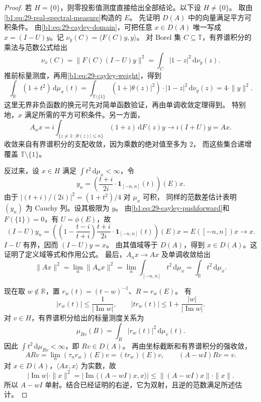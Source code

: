\begin{proof}
若 \(H=\{0\}\)，则零投影值测度直接给出全部结论。以下设 \(H\ne\{0\}\)。
取由\eqref{b1:eq:29-real-spectral-measure}构造的 \(E\)。
先证明 \(D(A)\) 中的向量满足平方可积条件。
由\eqref{b1:eq:29-cayley-domain}，可把任意 \(x\in D(A)\) 唯一写成
\(x=(I-U)y\)。记 \(\nu_y(C)=\langle F(C)y,y\rangle\)。
对 Borel 集 \(C\subseteq\mathbb T\)，有界谱积分的乘法与范数公式给出
\[
 \nu_x(C)=\|F(C)(I-U)y\|^2
 =\int_C|1-z|^2\,\mathrm d\nu_y(z).
\]
推前标量测度，再用\eqref{b1:eq:29-cayley-weight}，得到
\begin{equation}\label{b1:eq:29-cayley-domain-norm}
 \int_{\mathbb R}(1+t^2)\,\mathrm d\mu_x(t)
 =\int_{\mathbb T\setminus\{1\}}
   (1+|\theta(z)|^2)\cdot|1-z|^2\,\mathrm d\nu_y(z)
 =4\cdot\|y\|^2.
\end{equation}
这里无界非负函数的换元可先对简单函数验证，再由单调收敛定理得到。
特别地，\(x\) 满足所需的平方可积条件。另一方面，
\[
 A_nx
 =i\int_{\{z\ne1:\,|\theta(z)|\le n\}}
       (1+z)\,\mathrm dF(z)y
 \longrightarrow i(I+U)y=Ax.
\]
收敛来自有界谱积分的支配收敛，因为乘数的绝对值至多为 \(2\)，
而这些集合递增覆盖 \(\mathbb T\setminus\{1\}\)。

反过来，设 \(x\in H\) 满足 \(\int t^2\,\mathrm d\mu_x<\infty\)，令
\[
 y_n=\left(\frac{t+i}{2i}\cdot\mathbf1_{[-n,n]}(t)\right)(E)x.
\]
由于 \(|(t+i)/(2i)|^2=(1+t^2)/4\) 对 \(\mu_x\) 可积，
同样的范数差估计表明 \((y_n)\) 为 Cauchy 列。设其极限为 \(y\)。
由\eqref{b1:eq:29-cayley-pushforward}和 \(F(\{1\})=0\)，有 \(U=\phi(E)\)，故
\[
 (I-U)y_n
 =\left(\left(1-\frac{t-i}{t+i}\right)
          \frac{t+i}{2i}\cdot\mathbf1_{[-n,n]}(t)\right)(E)x
 =E([-n,n])x\longrightarrow x.
\]
\(I-U\) 有界，因而 \((I-U)y=x\)。
由其值域等于 \(D(A)\)，得到 \(x\in D(A)\)。这证明了定义域等式和作用公式。
最后，\(A_nx\to Ax\) 及单调收敛给出
\[
 \|Ax\|^2=\lim_n\|A_nx\|^2
 =\lim_n\int_{[-n,n]}t^2\,\mathrm d\mu_x
 =\int_{\mathbb R}t^2\,\mathrm d\mu_x.
\]

现在取 \(w\notin\mathbb R\)，置 \(r_w(t)=(t-w)^{-1}\)、\(R=r_w(E)\)。
有
\[
 |r_w(t)|\le\frac1{|\operatorname{Im}w|},\qquad
 |t r_w(t)|\le1+\frac{|w|}{|\operatorname{Im}w|}.
\]
对 \(v\in H\)，有界谱积分给出的标量测度关系为
\[
 \mu_{Rv}(B)=\int_B|r_w(t)|^2\,\mathrm d\mu_v(t).
\]
因此 \(\int t^2\,\mathrm d\mu_{Rv}<\infty\)，即 \(Rv\in D(A)\)。
再由坐标截断和有界谱积分的强收敛，
\[
 ARv=\lim_n(\tau_n r_w)(E)v=(t r_w)(E)v,
 \qquad (A-wI)Rv=v.
\]
对 \(x\in D(A)\)，\(\langle Ax,x\rangle\) 为实数，故
\[
 |\operatorname{Im}w|\cdot\|x\|^2
 =\bigl|\operatorname{Im}\langle(A-wI)x,x\rangle\bigr|
 \le\|(A-wI)x\|\cdot\|x\|.
\]
所以 \(A-wI\) 单射。结合已经证明的右逆，它为双射，且逆的范数满足所述估计。


\end{proof}
